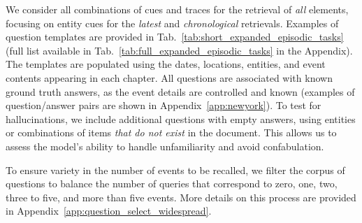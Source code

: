 \documentclass{article}
\begin{document}
We consider all combinations of cues and traces for the retrieval of \textit{all} elements, focusing on entity cues for the \textit{latest} and \textit{chronological} retrievals. Examples of question templates are provided in Tab.~\ref{tab:short_expanded_episodic_tasks} (full list available in Tab.~\ref{tab:full_expanded_episodic_tasks} in the Appendix). 
The templates are populated using the dates, locations, entities, and event contents appearing in each chapter. All questions are associated with known ground truth answers, as the event details are controlled and known (examples of question/answer pairs are shown in Appendix~\ref{app:newyork}). To test for hallucinations, we include additional questions with empty answers, using entities or combinations of items \textit{that do not exist} in the document. This allows us to assess the model's ability to handle unfamiliarity and avoid confabulation. %

To ensure variety in the number of events to be recalled, we filter the corpus of questions to balance the number of queries that correspond to zero, one, two, three to five, and more than five events. More details on this process are provided in Appendix~\ref{app:question_select_widespread}.
\end{document}
